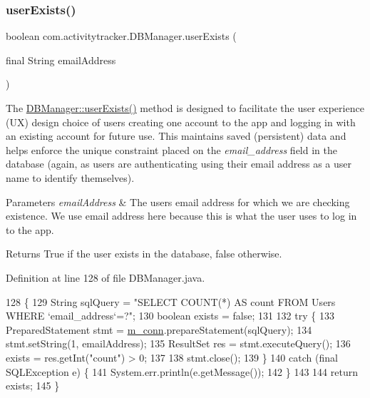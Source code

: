 \subsubsection{\texorpdfstring{user\+Exists()}{userExists()}}
{\footnotesize\ttfamily boolean com.\+activitytracker.\+D\+B\+Manager.\+user\+Exists (\begin{DoxyParamCaption}\item[{final String}]{email\+Address }\end{DoxyParamCaption})}

The \mbox{\hyperlink{classcom_1_1activitytracker_1_1_d_b_manager_af05d79f33ecf2920a67d1b9cf82c079f}{D\+B\+Manager\+::user\+Exists()}} method is designed to facilitate the user experience (UX) design choice of users creating one account to the app and logging in with an existing account for future use. This maintains saved (persistent) data and helps enforce the unique constraint placed on the {\itshape email\+\_\+address} field in the database (again, as users are authenticating using their email address as a user name to identify themselves).


\begin{DoxyParams}{Parameters}
{\em email\+Address} & The user\textquotesingle{}s email address for which we are checking existence. We use email address here because this is what the user uses to log in to the app. \\
\hline
\end{DoxyParams}
\begin{DoxyReturn}{Returns}
True if the user exists in the database, false otherwise. 
\end{DoxyReturn}


Definition at line 128 of file D\+B\+Manager.\+java.


\begin{DoxyCode}
128                                                           \{
129         String sqlQuery = \textcolor{stringliteral}{"SELECT COUNT(*) AS count FROM Users WHERE `email\_address`=?"};
130         \textcolor{keywordtype}{boolean} exists = \textcolor{keyword}{false};
131 
132         \textcolor{keywordflow}{try} \{
133             PreparedStatement stmt = \mbox{\hyperlink{classcom_1_1activitytracker_1_1_d_b_manager_a064088d13ac09eb147fdc19268771521}{m\_conn}}.prepareStatement(sqlQuery);
134             stmt.setString(1, emailAddress);
135             ResultSet res = stmt.executeQuery();
136             exists = res.getInt(\textcolor{stringliteral}{"count"}) > 0;
137 
138             stmt.close();
139         \}
140         \textcolor{keywordflow}{catch} (\textcolor{keyword}{final} SQLException e) \{
141             System.err.println(e.getMessage());
142         \}
143 
144         \textcolor{keywordflow}{return} exists;
145     \}
\end{DoxyCode}


